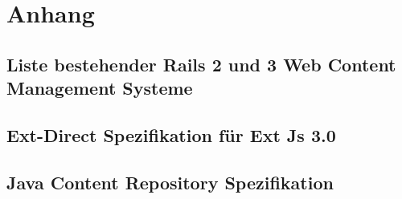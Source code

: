 \chapter{Anhang}
\section{Liste bestehender Rails 2 und 3 Web Content Management Systeme}
\section{Ext-Direct Spezifikation für Ext Js 3.0}



\section{Java Content Repository Spezifikation}
%

